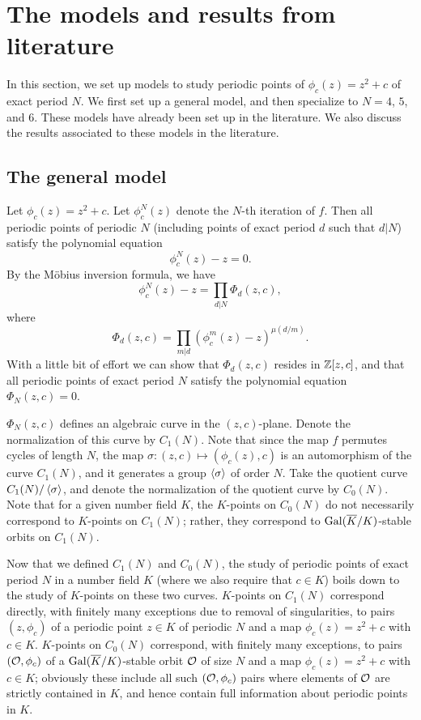 \section{The models and results from literature}
\label{sec:model}

In this section, we set up models to study periodic points of
$\phi_c(z) = z^2 + c$ of exact period $N$. We first set up a general
model, and then specialize to $N = 4$, $5$, and $6$. These models have
already been set up in the literature. We also discuss the results
associated to these models in the literature.

\subsection{The general model}

Let $\phi_c(z) = z^2 + c$. Let $\phi_c^N(z)$ denote the $N$-th
iteration of $f$. Then all periodic points of periodic $N$ (including
points of exact period $d$ such that $d | N$) satisfy the polynomial
equation
\[
\phi_c^N(z) - z = 0.
\]
By the M\"obius inversion formula, we have
\[
\phi_c^N(z) - z = \prod_{d|N} \Phi_d(z, c),
\]
where
\[
\Phi_d(z, c) = \prod_{m|d}(\phi_c^m(z) - z)^{\mu(d/m)}.
\]
With a little bit of effort we can show that $\Phi_d(z, c)$ resides in
$\mathbb{Z}[z, c]$, and that all periodic points of exact period $N$ satisfy
the polynomial equation $\Phi_N(z, c) = 0$.

$\Phi_N(z, c)$ defines an algebraic curve in the $(z,
c)$-plane. Denote the normalization of this curve by $C_1(N)$. Note
that since the map $f$ permutes cycles of length $N$, the map $\sigma:
(z, c) \mapsto (\phi_c(z), c)$ is an automorphism of the curve
$C_1(N)$, and it generates a group $\left<\sigma\right>$ of order $N$. Take
the quotient curve $C_1(N)/\left<\sigma\right>$, and denote the normalization
of the quotient curve by $C_0(N)$. Note that for a given number field
$K$, the $K$-points on $C_0(N)$ do not necessarily correspond to
$K$-points on $C_1(N)$; rather, they correspond to
$\mathrm{Gal}(\overline{K}/K)$-stable orbits on $C_1(N)$.

Now that we defined $C_1(N)$ and $C_0(N)$, the study of periodic points
of exact period $N$ in a number field $K$ (where we also require that
$c \in K$) boils down to the study of $K$-points on these two
curves. $K$-points on $C_1(N)$ correspond directly, with finitely many
exceptions due to removal of singularities, to pairs $(z, \phi_c)$ of
a periodic point $z \in K$ of periodic $N$ and a map $\phi_c(z) = z^2
+ c$ with $c \in K$. $K$-points on $C_0(N)$ correspond, with finitely
many exceptions, to pairs $(\mathcal{O}, \phi_c)$ of a $\mathrm{Gal}(\overline{K}/K)$-stable
orbit $\mathcal{O}$ of size $N$ and a map $\phi_c(z) = z^2 + c$ with $c \in K$;
obviously these include all such $(\mathcal{O}, \phi_c)$ pairs where elements
of $\mathcal{O}$ are strictly contained in $K$, and hence contain full
information about periodic points in $K$.

